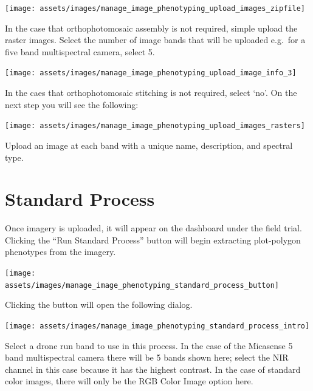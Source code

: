 \documentclass[
  12pt,
]{book}
\begin{document}
\begin{center}\texttt{[image: assets/images/manage\_image\_phenotyping\_upload\_images\_zipfile]} \end{center}

In the case that orthophotomosaic assembly is not required, simple upload the raster images. Select the number of image bands that will be uploaded e.g.~for a five band multispectral camera, select 5.

\begin{center}\texttt{[image: assets/images/manage\_image\_phenotyping\_upload\_image\_info\_3]} \end{center}

In the caes that orthophotomosaic stitching is not required, select `no'. On the next step you will see the following:

\begin{center}\texttt{[image: assets/images/manage\_image\_phenotyping\_upload\_images\_rasters]} \end{center}

Upload an image at each band with a unique name, description, and spectral type.

\hypertarget{standard-process}{%
\section{Standard Process}\label{standard-process}}

Once imagery is uploaded, it will appear on the dashboard under the field trial. Clicking the ``Run Standard Process'' button will begin extracting plot-polygon phenotypes from the imagery.

\begin{center}\texttt{[image: assets/images/manage\_image\_phenotyping\_standard\_process\_button]} \end{center}

Clicking the button will open the following dialog.

\begin{center}\texttt{[image: assets/images/manage\_image\_phenotyping\_standard\_process\_intro]} \end{center}

Select a drone run band to use in this process. In the case of the Micasense 5 band multispectral camera there will be 5 bands shown here; select the NIR channel in this case because it has the highest contrast. In the case of standard color images, there will only be the RGB Color Image option here.
\end{document}
